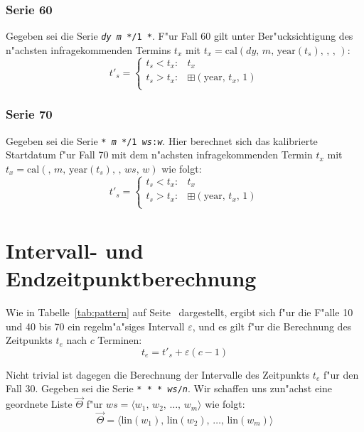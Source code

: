 \documentclass[a4paper]{article}
\newcommand*{\yearf}{\mathrm{year}}
\newcommand*{\linf}{\mathrm{lin}}
\newcommand*{\calf}{\mathrm{cal}}
\newcommand*{\addff}{\boxplus}
\numberwithin{equation}{section}
\begin{document}
\subsubsection{Serie 60}
Gegeben sei die Serie \texttt{\textit{dy} \textit{m} */1 *}. F"ur Fall 60 gilt
unter Ber"ucksichtigung des n"achsten infragekommenden Termins $t_x$ mit
$t_x = \calf(dy,\,m,\,\yearf(t_s),\,,\,,\,)$:
\begin{equation}
  t'_s = \left\{\begin{array}{ll}
    t_s < t_x : & t_x \\
    t_s > t_x : & \addff(\yearf,\,t_x,\,1) \\
  \end{array}\right.
\end{equation}

\subsubsection{Serie 70}
Gegeben sei die Serie \texttt{* \textit{m} */1 \textit{ws}:\textit{w}}. Hier
berechnet sich das kalibrierte Startdatum f"ur Fall 70 mit dem n"achsten
infragekommenden Termin $t_x$ mit $t_x = \calf(,\,m,\,\yearf(t_s),\,,\,ws,\,w)$
wie folgt:
\begin{equation}
  t'_s = \left\{\begin{array}{ll}
    t_s < t_x : & t_x \\
    t_s > t_x : & \addff(\yearf,\,t_x,\,1) \\
  \end{array}\right.
\end{equation}



%
%
%
%
\section{Intervall- und Endzeitpunktberechnung}
\noindent Wie in Tabelle~\ref{tab:pattern} auf Seite~\pageref{tab:pattern}
dargestellt, ergibt sich f"ur die F"alle 10 und 40 bis 70 ein regelm"a"siges
Intervall $\varepsilon$, und es gilt f"ur die Berechnung des Zeitpunkts $t_e$
nach $c$ Terminen:
\begin{equation}\label{eqn:endEasy}
  t_e = t'_s + \varepsilon(c - 1)
\end{equation}

\noindent Nicht trivial ist dagegen die Berechnung der Intervalle des Zeitpunkts
$t_e$ f"ur den Fall 30. Gegeben sei die Serie
\texttt{* * * \textit{ws}/\textit{n}}. Wir schaffen uns zun"achst eine geordnete
Liste $\vec{\Theta}$ f"ur $ws = \langle w_1,\,w_2,\,\dots,\,w_m\rangle$ wie
folgt:
\begin{equation}
  \vec{\Theta} = \langle \linf(w_1),\,\linf(w_2),\,\dots,\,\linf(w_m)\rangle
\end{equation}
\end{document}
